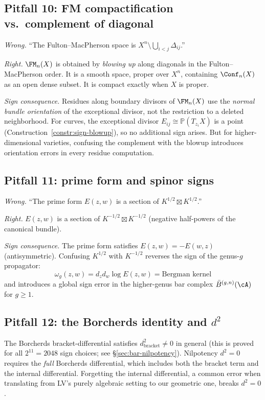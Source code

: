 \subsection{Pitfall 10: FM compactification vs.\ complement of diagonal}

\emph{Wrong.} ``The Fulton--MacPherson space is $X^n \setminus \bigcup_{i<j}\Delta_{ij}$.''

\emph{Right.} $\FM_n(X)$ is obtained by \emph{blowing up} along diagonals
in the Fulton--MacPherson order. It is a smooth space, proper over
$X^n$, containing $\Conf_n(X)$ as an open dense subset. It is compact
exactly when $X$ is proper.

\emph{Sign consequence.} Residues along boundary divisors of $\FM_n(X)$ use
the \emph{normal bundle orientation} of the exceptional divisor, not the
restriction to a deleted neighborhood. For curves, the exceptional divisor
$E_{ij} \cong \mathbb{P}(T_{z_i}X)$ is a point (Construction~\ref{constr:sign-blowup}),
so no additional sign arises. But for higher-dimensional varieties,
confusing the complement with the blowup introduces orientation errors
in every residue computation.

\subsection{Pitfall 11: prime form and spinor signs}

\emph{Wrong.} ``The prime form $E(z,w)$ is a section of $K^{1/2} \boxtimes K^{1/2}$.''

\emph{Right.} $E(z,w)$ is a section of $K^{-1/2} \boxtimes K^{-1/2}$
(negative half-powers of the canonical bundle).

\emph{Sign consequence.} The prime form satisfies $E(z,w) = -E(w,z)$
(antisymmetric). Confusing $K^{1/2}$ with $K^{-1/2}$ reverses the
sign of the genus-$g$ propagator:
\[
\omega_g(z,w) = d_z d_w \log E(z,w) = \text{Bergman kernel}
\]
and introduces a global sign error in the higher-genus bar complex
$\bar{B}^{(g,n)}(\cA)$ for $g \geq 1$.

\subsection{Pitfall 12: the Borcherds identity and $d^2$}

The Borcherds bracket-differential satisfies $d_{\mathrm{bracket}}^2 \neq 0$
in general (this is proved for all $2^{11} = 2048$ sign choices; see
\S\ref{sec:bar-nilpotency}). Nilpotency $d^2 = 0$ requires the
\emph{full} Borcherds differential, which includes both the bracket term
and the internal differential. Forgetting the internal differential, a
common error when translating from LV's purely algebraic setting to our
geometric one, breaks $d^2 = 0$.

